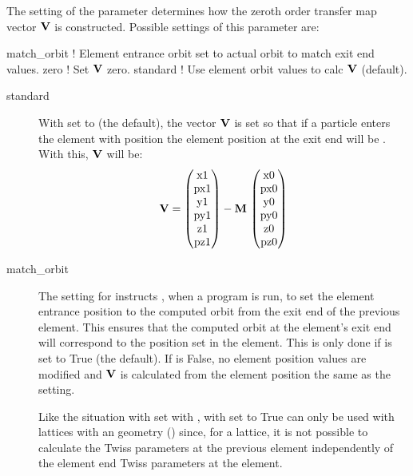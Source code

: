 {
The setting of the  parameter determines how the zeroth order transfer map vector ${\bf V}$ is
constructed. Possible settings of this parameter are:
\begin{example}
  match_orbit    ! Element entrance orbit set to actual orbit to match exit end values.
  zero           ! Set \({\bf V}\) zero.
  standard       ! Use element orbit values to calc \({\bf V}\) (default).
\end{example}
%
\begin{description} 
%
\item[standard] \Newline
With  set to  (the default), the vector ${\bf V}$ is set so that if a particle
enters the  element with position  the element position
at the exit end will be . With this, ${\bf V}$ will be:
\begin{equation}
  {\bf V} = 
    \begin{pmatrix} 
    \text{x1} \\ \text{px1} \\ \text{y1} \\ \text{py1} \\ \text{z1} \\ \text{pz1} 
    \end{pmatrix} -
    {\bf M} \, \begin{pmatrix} 
    \text{x0} \\ \text{px0} \\ \text{y0} \\ \text{py0} \\ \text{z0} \\ \text{pz0} 
    \end{pmatrix}
\end{equation}
%
\item[match_orbit] \Newline
The  setting for  instructs \bmad, when a program is run, to set the element
entrance position to the computed orbit from the exit end of the previous element. This ensures that
the computed orbit at the element's exit end will correspond to the position set in the
element. This is only done if  is set to True (the default). If  is False, no
element position values are modified and ${\bf V}$ is calculated from the element position the same as
the  setting.

Like the situation with  set with ,  with  set
to True can only be used with lattices with an  geometry () since, for a
 lattice, it is not possible to calculate the Twiss parameters at the previous element
independently of the element end Twiss parameters at the  element.


\end{description}}
